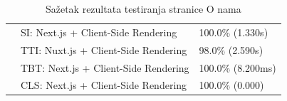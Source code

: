 \begin{table}[H]
{\begin{tabular}{|l|l|l|}
                            & SI: Next.js + Client-Side Rendering          & 100.0\% (1.330s)  \\[0.2em]
                            & TTI: Nuxt.js + Client-Side Rendering         & 98.0\% (2.590s)   \\[0.2em]
                            & TBT: Next.js + Client-Side Rendering         & 100.0\% (8.200ms) \\[0.2em]
                            & CLS: Next.js + Client-Side Rendering         & 100.0\% (0.000)   \\
        \hline
    \end{tabular}%
}
\caption{Sažetak rezultata testiranja stranice O nama}

\end{table}


